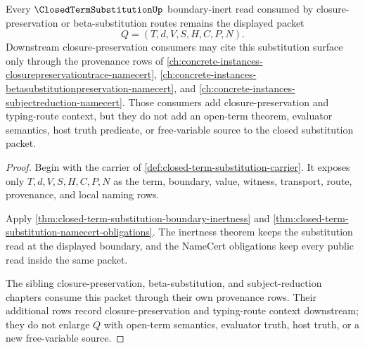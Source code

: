 \begin{theorem}
\label{thm:closed-term-substitution-closure-preservation-provenance}
Every $\ClosedTermSubstitutionUp$ boundary-inert read consumed by closure-preservation or beta-substitution routes remains the displayed packet
$$
Q=(T,d,V,S,H,C,P,N).
$$
Downstream closure-preservation consumers may cite this substitution surface only through the provenance rows of \autoref{ch:concrete-instances-closurepreservationtrace-namecert}, \autoref{ch:concrete-instances-betasubstitutionpreservation-namecert}, and \autoref{ch:concrete-instances-subjectreduction-namecert}. Those consumers add closure-preservation and typing-route context, but they do not add an open-term theorem, evaluator semantics, host truth predicate, or free-variable source to the closed substitution packet.
\end{theorem}
\begin{proof}
Begin with the carrier of \autoref{def:closed-term-substitution-carrier}. It exposes only $T,d,V,S,H,C,P,N$ as the term, boundary, value, witness, transport, route, provenance, and local naming rows.

Apply \autoref{thm:closed-term-substitution-boundary-inertness} and \autoref{thm:closed-term-substitution-namecert-obligations}. The inertness theorem keeps the substitution read at the displayed boundary, and the NameCert obligations keep every public read inside the same packet.

The sibling closure-preservation, beta-substitution, and subject-reduction chapters consume this packet through their own provenance rows. Their additional rows record closure-preservation and typing-route context downstream; they do not enlarge $Q$ with open-term semantics, evaluator truth, host truth, or a new free-variable source.
\end{proof}

